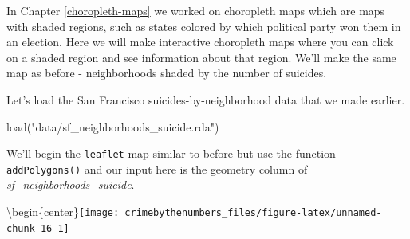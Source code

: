 \documentclass[
]{krantz}
\makeatletter
\newenvironment{Shaded}{\begin{snugshade}}{\end{snugshade}}
\newcommand{\AttributeTok}[1]{\textcolor[rgb]{0.61,0.61,0.61}{#1}}
\newcommand{\CommentTok}[1]{\textcolor[rgb]{0.37,0.37,0.37}{\textit{#1}}}
\newcommand{\FunctionTok}[1]{\textcolor[rgb]{0,0,0}{#1}}
\newcommand{\NormalTok}[1]{#1}
\newcommand{\SpecialCharTok}[1]{\textcolor[rgb]{0,0,0}{#1}}
\newcommand{\StringTok}[1]{\textcolor[rgb]{0.5,0.5,0.5}{#1}}
\newenvironment{kframe}{%
\medskip{}
\setlength{\fboxsep}{.8em}
 \def\at@end@of@kframe{}%
 \ifinner\ifhmode%
  \def\at@end@of@kframe{\end{minipage}}%
  \begin{minipage}{\columnwidth}%
 \fi\fi%
 \def\FrameCommand##1{\hskip\@totalleftmargin \hskip-\fboxsep
 \colorbox{shadecolor}{##1}\hskip-\fboxsep
     \hskip-\linewidth \hskip-\@totalleftmargin \hskip\columnwidth}%
 \MakeFramed {\advance\hsize-\width
   \@totalleftmargin\z@ \linewidth\hsize
   \@setminipage}}%
 {\par\unskip\endMakeFramed%
 \at@end@of@kframe}
\renewenvironment{Shaded}{\begin{kframe}}{\end{kframe}}
\makeatother
\begin{document}
In Chapter \ref{choropleth-maps} we worked on choropleth maps which are maps with shaded regions, such as states colored by which political party won them in an election. Here we will make interactive choropleth maps where you can click on a shaded region and see information about that region. We'll make the same map as before - neighborhoods shaded by the number of suicides.

Let's load the San Francisco suicides-by-neighborhood data that we made earlier.

\begin{Shaded}
\begin{Highlighting}[]
\FunctionTok{load}\NormalTok{(}\StringTok{"data/sf\_neighborhoods\_suicide.rda"}\NormalTok{)}
\end{Highlighting}
\end{Shaded}

We'll begin the \texttt{leaflet} map similar to before but use the function \texttt{addPolygons()} and our input here is the geometry column of \emph{sf\_neighborhoods\_suicide}.

\begin{Shaded}
\end{Shaded}

\textbackslash begin\{center\}\texttt{[image: crimebythenumbers\_files/figure-latex/unnamed-chunk-16-1]}
\end{document}
